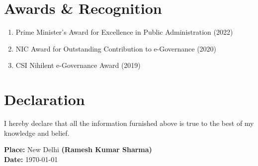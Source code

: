 \documentclass[12pt,letterpaper]{article}
\begin{document}
\section{Awards \& Recognition}
\begin{enumerate}
\item Prime Minister's Award for Excellence in Public Administration (2022)
\item NIC Award for Outstanding Contribution to e-Governance (2020)
\item CSI Nihilent e-Governance Award (2019)
\end{enumerate}

\section{Declaration}
I hereby declare that all the information furnished above is true to the best of my knowledge and belief.

\vspace{20pt}
\noindent\textbf{Place:} New Delhi \hfill \textbf{(Ramesh Kumar Sharma)}\\
\textbf{Date:} \today
\end{document}
